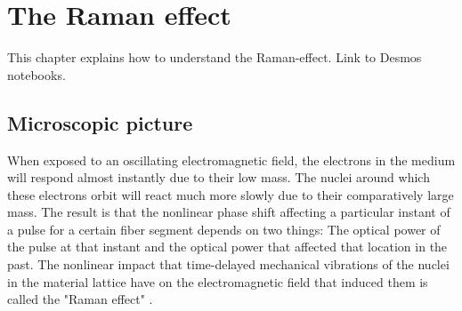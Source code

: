\chapter{The Raman effect}
\label{ch:Raman}

This chapter explains how to understand the Raman-effect. Link to Desmos notebooks. 

\section{Microscopic picture}
When exposed to an oscillating electromagnetic field, the electrons in the medium will respond almost instantly due to their low mass. The nuclei around which these electrons orbit will react much more slowly due to their comparatively large mass. The result is that the nonlinear phase shift affecting a particular instant of a pulse for a certain fiber segment depends on two things: The optical power of the pulse at that instant and the optical power that affected that location in the past. The nonlinear impact that time-delayed mechanical vibrations of the nuclei in the material lattice have on the electromagnetic field that induced them is called the "Raman effect" \CITE.  



